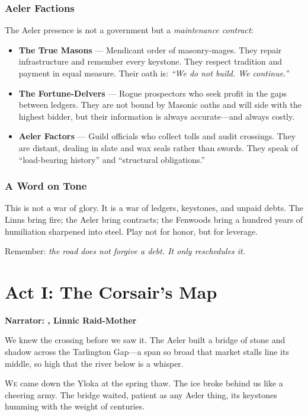 \documentclass[11pt,a5paper]{book}
\begin{document}
\subsection*{Aeler Factions}

The Aeler presence is not a government but a \textit{maintenance contract}:

\begin{itemize}[leftmargin=*]
\item \textbf{The True Masons} --- Mendicant order of masonry-mages. They repair infrastructure and remember every keystone. They respect tradition and payment in equal measure. Their oath is: \textit{``We do not build. We continue.''}
\item \textbf{The Fortune-Delvers} --- Rogue prospectors who seek profit in the gaps between ledgers. They are not bound by Masonic oaths and will side with the highest bidder, but their information is always accurate---and always costly.
\item \textbf{Aeler Factors} --- Guild officials who collect tolls and audit crossings. They are distant, dealing in slate and wax seals rather than swords. They speak of ``load-bearing history'' and ``structural obligations.''
\end{itemize}

\subsection*{A Word on Tone}

This is not a war of glory. It is a war of ledgers, keystones, and unpaid debts. The Linns bring fire; the Aeler bring contracts; the Fenwoods bring a hundred years of humiliation sharpened into steel. Play not for honor, but for leverage. 

Remember: \textit{the road does not forgive a debt. It only reschedules it.}

\clearpage

\chapter{Act I: The Corsair's Map}
\textbf{Narrator: \soren, Linnic Raid-Mother}

\epigraph{We knew the crossing before we saw it. The Aeler built a bridge of stone and shadow across the Tarlington Gap---a span so broad that market stalls line its middle, so high that the river below is a whisper.}{\soren}

\lettrine{W}{e} came down the Yloka at the spring thaw. The ice broke behind us like a cheering army. The bridge waited, patient as any Aeler thing, its keystones humming with the weight of centuries.
\end{document}
